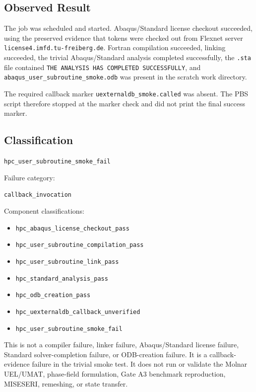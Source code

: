 \documentclass[11pt,a4paper]{article}
\begin{document}
\subsection*{Observed Result}

The job was scheduled and started. Abaqus/Standard license checkout succeeded, using the preserved evidence that tokens were checked out from Flexnet server \texttt{license4.imfd.tu-freiberg.de}. Fortran compilation succeeded, linking succeeded, the trivial Abaqus/Standard analysis completed successfully, the \texttt{.sta} file contained \texttt{THE ANALYSIS HAS COMPLETED SUCCESSFULLY}, and \texttt{abaqus\_user\_subroutine\_smoke.odb} was present in the scratch work directory.

The required callback marker \texttt{uexternaldb\_smoke.called} was absent. The PBS script therefore stopped at the marker check and did not print the final success marker.

\subsection*{Classification}

\begin{center}
\texttt{hpc\_user\_subroutine\_smoke\_fail}
\end{center}

Failure category:

\begin{center}
\texttt{callback\_invocation}
\end{center}

Component classifications:

\begin{itemize}
  \item \texttt{hpc\_abaqus\_license\_checkout\_pass}
  \item \texttt{hpc\_user\_subroutine\_compilation\_pass}
  \item \texttt{hpc\_user\_subroutine\_link\_pass}
  \item \texttt{hpc\_standard\_analysis\_pass}
  \item \texttt{hpc\_odb\_creation\_pass}
  \item \texttt{hpc\_uexternaldb\_callback\_unverified}
  \item \texttt{hpc\_user\_subroutine\_smoke\_fail}
\end{itemize}

This is not a compiler failure, linker failure, Abaqus/Standard license failure, Standard solver-completion failure, or ODB-creation failure. It is a callback-evidence failure in the trivial smoke test. It does not run or validate the Molnar UEL/UMAT, phase-field formulation, Gate A3 benchmark reproduction, MISESERI, remeshing, or state transfer.
\end{document}

